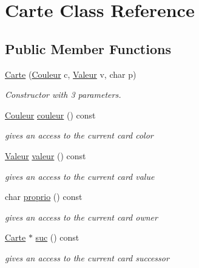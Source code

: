 \hypertarget{class_carte}{
\section{Carte Class Reference}
\label{class_carte}
}
\subsection*{Public Member Functions}
\begin{DoxyCompactItemize}
\item 
\hyperlink{class_carte_af149f6331c1f23f96239f01397d885e6}{Carte} (\hyperlink{_carte_8h_aa304d0ca681f782b1d7735da33037dd7}{Couleur} c, \hyperlink{_carte_8h_a44967720f2d16f8ec13b66b11ee4dd2f}{Valeur} v, char p)
\begin{DoxyCompactList}\small\item\em Constructor with 3 parameters. \item\end{DoxyCompactList}\item 
\hyperlink{_carte_8h_aa304d0ca681f782b1d7735da33037dd7}{Couleur} \hyperlink{class_carte_ae30ae4dd0507816fca34aeb482c1f9ef}{couleur} () const 
\begin{DoxyCompactList}\small\item\em gives an access to the current card color \item\end{DoxyCompactList}\item 
\hyperlink{_carte_8h_a44967720f2d16f8ec13b66b11ee4dd2f}{Valeur} \hyperlink{class_carte_a6c698d6dd7ebc25a00dd9d07748946cc}{valeur} () const 
\begin{DoxyCompactList}\small\item\em gives an access to the current card value \item\end{DoxyCompactList}\item 
char \hyperlink{class_carte_ac8ab17d79c87c9afd75d02287f3b0c84}{proprio} () const 
\begin{DoxyCompactList}\small\item\em gives an access to the current card owner \item\end{DoxyCompactList}\item 
\hyperlink{class_carte}{Carte} $\ast$ \hyperlink{class_carte_ad303ca1f958b92c9101db475e4beb38d}{suc} () const 
\begin{DoxyCompactList}\small\item\em gives an access to the current card successor \item\end{DoxyCompactList}\item 

\end{DoxyCompactItemize}

